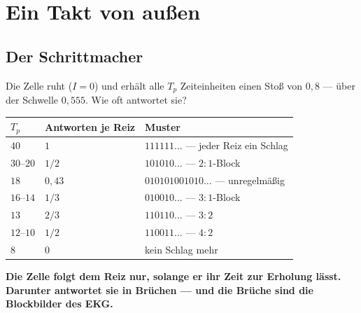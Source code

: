 \chapter{Ein Takt von außen}

\section{Der Schrittmacher}

\begin{merksatz}
Die Zelle ruht ($I = 0$) und erhält alle $T_p$ Zeiteinheiten einen Stoß von $0{,}8$ --- über der Schwelle $0{,}555$. Wie oft antwortet sie?

\begin{center}
{\small
\renewcommand{\arraystretch}{1.46}
\begin{tabular}{@{}P{1.4cm}P{2.4cm}P{4.6cm}@{}}
\toprule
$T_p$ & \textbf{Antworten je Reiz} & \textbf{Muster}\\
\midrule
$40$ & $1$ & $111111\ldots$ --- jeder Reiz ein Schlag\\
$30$--$20$ & $1/2$ & $101010\ldots$ --- $2\!:\!1$-Block\\
$18$ & $0{,}43$ & $010101001010\ldots$ --- unregelmäßig\\
$16$--$14$ & $1/3$ & $010010\ldots$ --- $3\!:\!1$-Block\\
$13$ & $2/3$ & $110110\ldots$ --- $3\!:\!2$\\
$12$--$10$ & $1/2$ & $110011\ldots$ --- $4\!:\!2$\\
$8$ & $0$ & kein Schlag mehr\\
\bottomrule
\end{tabular}}
\end{center}

\begin{center}
\begin{minipage}{0.9\textwidth}
\textbf{Die Zelle folgt dem Reiz nur, solange er ihr Zeit zur Erholung lässt. Darunter antwortet sie in Brüchen --- und die Brüche sind die Blockbilder des EKG.}
\end{minipage}
\end{center}

\begin{center}
\begin{minipage}{0.88\textwidth}
\end{minipage}
\end{center}
\end{merksatz}

